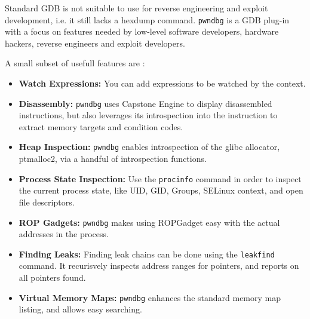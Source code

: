 \documentclass{article}
\begin{document}
Standard GDB is not suitable to use for reverse engineering and exploit development, i.e. it still lacks a hexdump 
command. \texttt{pwndbg} is a GDB plug-in with a focus on features needed by low-level software developers, hardware 
hackers, reverse engineers and exploit developers. 

A small subset of usefull features are \citep{pwngdb}:
\begin{itemize}
\item{\textbf{Watch Expressions:}} You can add expressions to be watched by the context.
\item{\textbf{Disassembly:}} \texttt{pwndbg} uses Capstone Engine to display disassembled instructions, but also 
leverages its introspection into the instruction to extract memory targets and condition codes.
\item{\textbf{Heap Inspection:}} \texttt{pwndbg} enables introspection of the glibc allocator, ptmalloc2, via a 
handful of introspection functions.
\item{\textbf{Process State Inspection:}} Use the \texttt{procinfo} command in order to inspect the current process state, 
like UID, GID, Groups, SELinux context, and open file descriptors.
\item{\textbf{ROP Gadgets:}} \texttt{pwndbg} makes using ROPGadget easy with the actual addresses in the process.
\item{\textbf{Finding Leaks:}} Finding leak chains can be done using the \texttt{leakfind} command. It recurisvely 
inspects address ranges for pointers, and reports on all pointers found.
\item{\textbf{Virtual Memory Maps:}} \texttt{pwndbg} enhances the standard memory map listing, and allows easy searching.
\end{itemize}
\end{document}
